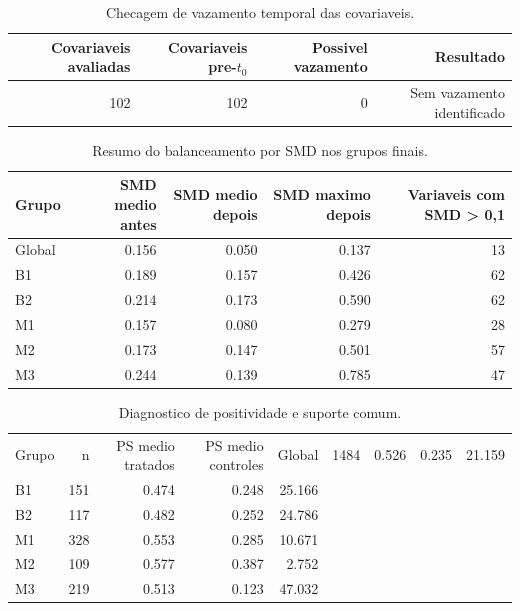 \begin{table}[htbp]
\centering
\small
\caption{Checagem de vazamento temporal das covariaveis.}
\label{tab:temporal_leakage}
\begin{tabular}{rrrr}
\toprule
Covariaveis avaliadas & Covariaveis pre-$t_0$ & Possivel vazamento & Resultado \\
\midrule
102 & 102 & 0 & Sem vazamento identificado \\
\bottomrule
\end{tabular}
\end{table}


\begin{table}[htbp]
\centering
\small
\caption{Resumo do balanceamento por SMD nos grupos finais.}
\label{tab:smd_balance}
\begin{tabular}{lrrrr}
\toprule
Grupo & SMD medio antes & SMD medio depois & SMD maximo depois & Variaveis com SMD > 0,1 \\
\midrule
Global & 0.156 & 0.050 & 0.137 & 13 \\
B1 & 0.189 & 0.157 & 0.426 & 62 \\
B2 & 0.214 & 0.173 & 0.590 & 62 \\
M1 & 0.157 & 0.080 & 0.279 & 28 \\
M2 & 0.173 & 0.147 & 0.501 & 57 \\
M3 & 0.244 & 0.139 & 0.785 & 47 \\
\bottomrule
\end{tabular}
\end{table}


\begin{table}[htbp]
\centering
\small
\caption{Diagnostico de positividade e suporte comum.}
\label{tab:positivity}
\begin{tabular}{lrrrr}
\toprule
Grupo & n & PS medio tratados & PS medio controles & %
\midrule
Global & 1484 & 0.526 & 0.235 & 21.159 \\
B1 & 151 & 0.474 & 0.248 & 25.166 \\
B2 & 117 & 0.482 & 0.252 & 24.786 \\
M1 & 328 & 0.553 & 0.285 & 10.671 \\
M2 & 109 & 0.577 & 0.387 & 2.752 \\
M3 & 219 & 0.513 & 0.123 & 47.032 \\
\bottomrule
\end{tabular}
\end{table}


